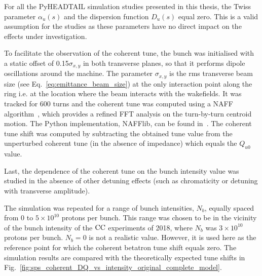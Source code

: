For all the PyHEADTAIL simulation studies presented in this thesis, the Twiss parameter $\alpha_u(s)$ and the dispersion function $D_u(s)$ equal zero. This is a valid assumption for the studies as these parameters have no direct impact on the effects under investigation.

To facilitate the observation of the coherent tune, the bunch was initialised with a static offset of 0.15$\sigma_{x,y}$ in both transverse planes, so that it performs dipole oscillations around the machine. The parameter $\sigma_{x,y}$ is the rms transverse beam size (see Eq.~\eqref{eq:emittance_beam_size}) at the only interaction point along the ring i.e. at the location where the beam interacts with the wakefields. It was tracked for 600 turns and the coherent tune was computed using a NAFF algorithm~\cite{LASKAR1990266, Kostoglou:2289645}, which provides a refined FFT analysis on the turn-by-turn centroid motion.  The Python implementation, NAFFlib, can be found in~\cite{nafflib_repository}. The coherent tune shift was computed by subtracting the obtained tune value from the unperturbed coherent tune (in the absence of impedance) which equals the $Q_{u0}$ value.

Last, the dependence of the coherent tune on the bunch intensity value was studied in the absence of other detuning effects (such as chromaticity or detuning with transverse amplitude). %

The simulation was repeated for a range of bunch intensities, $N_b$, equally spaced from 0 to $5 \times 10^{10}$ protons per bunch. This range was chosen to be in the vicinity of the bunch intensity of the ${\mathrm{CC}}$ experiments of 2018, where $N_b$ was $3\times 10^{10}$ protons per bunch. $N_b=0$ is not a realistic value. However, it is used here as the reference point for which the coherent betatron tune shift equals zero. The simulation results are compared with the theoretically expected tune shifts in Fig.~\ref{fig:sps_coherent_DQ_vs_intensity_original_complete_model}.


